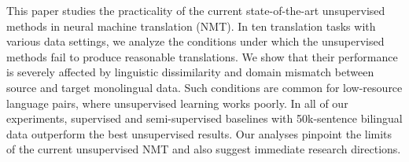 This paper studies the practicality of the current state-of-the-art unsupervised methods in neural machine translation (NMT). In ten translation tasks with various data settings, we analyze the conditions under which the unsupervised methods fail to produce reasonable translations. We show that their performance is severely affected by linguistic dissimilarity and domain mismatch between source and target monolingual data. Such conditions are common for low-resource language pairs, where unsupervised learning works poorly. In all of our experiments, supervised and semi-supervised baselines with 50k-sentence bilingual data outperform the best unsupervised results. Our analyses pinpoint the limits of the current unsupervised NMT and also suggest immediate research directions.
